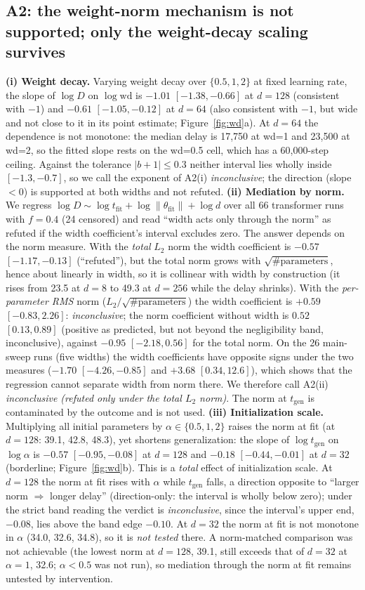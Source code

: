 \documentclass{article}
\newcommand{\tfit}{t_{\mathrm{fit}}}
\newcommand{\tgen}{t_{\mathrm{gen}}}
\begin{document}
\subsection{A2: the weight-norm mechanism is not supported; only the weight-decay scaling survives}
\label{sec:a2}
\textbf{(i) Weight decay.} Varying weight decay over $\{0.5,1,2\}$ at fixed learning rate, the slope of $\log D$ on $\log\mathrm{wd}$ is $-1.01$ $[-1.38,-0.66]$ at $d=128$ (consistent with $-1$) and $-0.61$ $[-1.05,-0.12]$ at $d=64$ (also consistent with $-1$, but wide and not close to it in its point estimate; Figure~\ref{fig:wd}a). At $d=64$ the dependence is not monotone: the median delay is 17{,}750 at wd=1 and 23{,}500 at wd=2, so the fitted slope rests on the wd=0.5 cell, which has a 60{,}000-step ceiling. Against the tolerance $|b+1|\le0.3$ neither interval lies wholly inside $[-1.3,-0.7]$, so we call the exponent of A2(i) \emph{inconclusive}; the direction (slope $<0$) is supported at both widths and not refuted.
\textbf{(ii) Mediation by norm.} We regress $\log D\sim\log\tfit+\log\lVert\theta_{\text{fit}}\rVert+\log d$ over all 66 transformer runs with $f=0.4$ (24 censored) and read ``width acts only through the norm'' as refuted if the width coefficient's interval excludes zero. The answer depends on the norm measure. With the \emph{total} $L_2$ norm the width coefficient is $-0.57$ $[-1.17,-0.13]$ (``refuted''), but the total norm grows with $\sqrt{\#\text{parameters}}$, hence about linearly in width, so it is collinear with width by construction (it rises from 23.5 at $d=8$ to 49.3 at $d=256$ while the delay shrinks). With the \emph{per-parameter RMS} norm ($L_2/\sqrt{\#\text{parameters}}$) the width coefficient is $+0.59$ $[-0.83,2.26]$: \emph{inconclusive}; the norm coefficient without width is $0.52$ $[0.13,0.89]$ (positive as predicted, but not beyond the negligibility band, inconclusive), against $-0.95$ $[-2.18,0.56]$ for the total norm. On the 26 main-sweep runs (five widths) the width coefficients have opposite signs under the two measures ($-1.70$ $[-4.26,-0.85]$ and $+3.68$ $[0.34,12.6]$), which shows that the regression cannot separate width from norm there. We therefore call A2(ii) \emph{inconclusive (refuted only under the total $L_2$ norm)}. The norm at $\tgen$ is contaminated by the outcome and is not used.
\textbf{(iii) Initialization scale.} Multiplying all initial parameters by $\alpha\in\{0.5,1,2\}$ raises the norm at fit (at $d=128$: 39.1, 42.8, 48.3), yet shortens generalization: the slope of $\log\tgen$ on $\log\alpha$ is $-0.57$ $[-0.95,-0.08]$ at $d=128$ and $-0.18$ $[-0.44,-0.01]$ at $d=32$ (borderline; Figure~\ref{fig:wd}b). This is a \emph{total} effect of initialization scale. At $d=128$ the norm at fit rises with $\alpha$ while $\tgen$ falls, a direction opposite to ``larger norm $\Rightarrow$ longer delay'' (direction-only: the interval is wholly below zero); under the strict band reading the verdict is \emph{inconclusive}, since the interval's upper end, $-0.08$, lies above the band edge $-0.10$. At $d=32$ the norm at fit is not monotone in $\alpha$ (34.0, 32.6, 34.8), so it is \emph{not tested} there. A norm-matched comparison was not achievable (the lowest norm at $d=128$, 39.1, still exceeds that of $d=32$ at $\alpha=1$, 32.6; $\alpha<0.5$ was not run), so mediation through the norm at fit remains untested by intervention.
\end{document}
